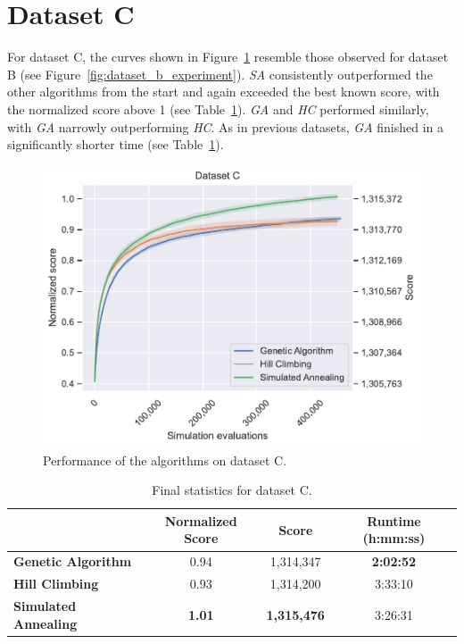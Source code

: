 \newpage
\section{Dataset C} \label{sec:dataset_c}

For dataset C, the curves shown in Figure~\ref{fig:dataset_c_experiment} resemble those observed for dataset B (see Figure~\ref{fig:dataset_b_experiment}). \textit{SA} consistently outperformed the other algorithms from the start and again exceeded the best known score, with the normalized score above 1 (see Table~\ref{tab:dataset_c_results}). \textit{GA} and \textit{HC} performed similarly, with \textit{GA} narrowly outperforming \textit{HC}. As in previous datasets, \textit{GA} finished in a significantly shorter time (see Table~\ref{tab:dataset_c_results}).

\bigskip

\begin{figure}[h]
    \centering
    \includegraphics[width=\linewidth]{img/experiments/c_Genetic Algorithm_Hill Climbing_Simulated Annealing.pdf}
    \caption[Performance of the algorithms on dataset C]{
        Performance of the algorithms on dataset C.
    }
    \label{fig:dataset_c_experiment}
\end{figure}

\bigskip

\begin{table}[h]
\centering\footnotesize\sf
\begin{tabular}{lccc}
\toprule
& Normalized Score & Score & Runtime (h:mm:ss) \\
\midrule
\textcolor{myblue}{\textbf{Genetic Algorithm}} & 0.94 & 1,314,347 & \textbf{2:02:52} \\
\textcolor{myorange}{\textbf{Hill Climbing}} & 0.93 & 1,314,200 & 3:33:10 \\
\textcolor{mygreen}{\textbf{Simulated Annealing}} & \textbf{1.01} & \textbf{1,315,476} & 3:26:31 \\
\bottomrule
\end{tabular}
\caption[Statistics for dataset C]{
    Final statistics for dataset C.
}
\label{tab:dataset_c_results}
\end{table}

